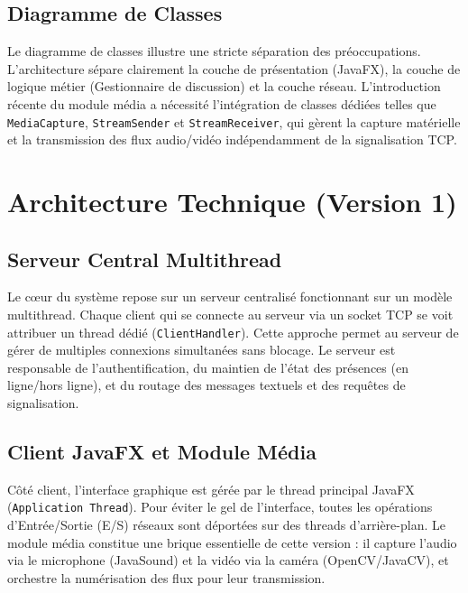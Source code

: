 \documentclass[12pt,a4paper]{article}
\begin{document}
\subsection{Diagramme de Classes}
Le diagramme de classes illustre une stricte séparation des préoccupations. L'architecture sépare clairement la couche de présentation (JavaFX), la couche de logique métier (Gestionnaire de discussion) et la couche réseau. L'introduction récente du module média a nécessité l'intégration de classes dédiées telles que \texttt{MediaCapture}, \texttt{StreamSender} et \texttt{StreamReceiver}, qui gèrent la capture matérielle et la transmission des flux audio/vidéo indépendamment de la signalisation TCP.

\section{Architecture Technique (Version 1)}

\subsection{Serveur Central Multithread}
Le cœur du système repose sur un serveur centralisé fonctionnant sur un modèle multithread. Chaque client qui se connecte au serveur via un socket TCP se voit attribuer un thread dédié (\texttt{ClientHandler}). Cette approche permet au serveur de gérer de multiples connexions simultanées sans blocage. Le serveur est responsable de l'authentification, du maintien de l'état des présences (en ligne/hors ligne), et du routage des messages textuels et des requêtes de signalisation.

\subsection{Client JavaFX et Module Média}
Côté client, l'interface graphique est gérée par le thread principal JavaFX (\texttt{Application Thread}). Pour éviter le gel de l'interface, toutes les opérations d'Entrée/Sortie (E/S) réseaux sont déportées sur des threads d'arrière-plan. Le module média constitue une brique essentielle de cette version : il capture l'audio via le microphone (JavaSound) et la vidéo via la caméra (OpenCV/JavaCV), et orchestre la numérisation des flux pour leur transmission.
\end{document}
